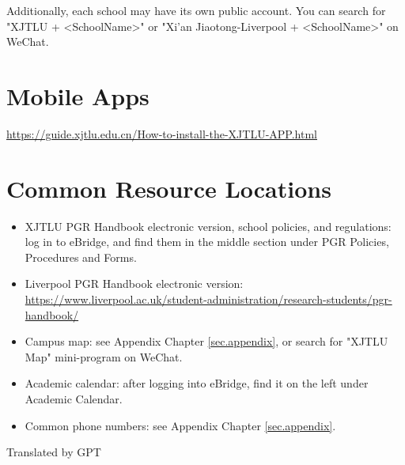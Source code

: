 Additionally, each school may have its own public account. You can search for "XJTLU + <SchoolName>" or "Xi'an Jiaotong-Liverpool + <SchoolName>" on WeChat.

\section{Mobile Apps}
\url{https://guide.xjtlu.edu.cn/How-to-install-the-XJTLU-APP.html}

\section{Common Resource Locations}
\begin{itemize}
    \item XJTLU PGR Handbook electronic version, school policies, and regulations: log in to eBridge, and find them in the middle section under PGR Policies, Procedures and Forms.
    \item Liverpool PGR Handbook electronic version: \url{https://www.liverpool.ac.uk/student-administration/research-students/pgr-handbook/}
    \item Campus map: see Appendix Chapter \ref{sec.appendix}, or search for "XJTLU Map" mini-program on WeChat.
    \item Academic calendar: after logging into eBridge, find it on the left under Academic Calendar.
    \item Common phone numbers: see Appendix Chapter \ref{sec.appendix}.
\end{itemize}

\begin{flushright}
    Translated by GPT
\end{flushright}